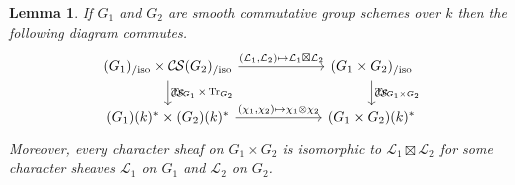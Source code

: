 \documentclass[10pt]{amsart}
\theoremstyle{plain}
\newtheorem{lemma}[theorem]{Lemma}
\theoremstyle{definition}
\newcommand{\Fq}{k}
\DeclareMathOperator{\id}{id}
\newcommand{\ceq}{{\, :=\, }}
\newcommand{\iso}{{\ \cong\ }}
\newcommand{\TrFrob}[1]{\operatorname{Tr}_{#1}}
\newcommand{\cs}[1]{{\mathcal{#1}}}
\newcommand{\gcs}[1]{{\mathcal{\bar #1}}}
\newcommand{\CS}{{\mathcal{C\hskip-0.8pt S}}}
\newcommand{\CSiso}[1]{\CS(#1)_{/\text{iso}}}
\begin{document}
\begin{lemma}\label{lem:product}
If $G_1$ and $G_2$ are smooth commutative group schemes over $\Fq$ then the following diagram commutes.
\[
\begin{tikzcd}[column sep=60]
\arrow{d}{\TrFrob{G_1} \times \TrFrob{G_2}} \CSiso{G_1}\times \CSiso{G_2} \arrow{r}{(\cs{L}_1,\cs{L}_2)\mapsto \cs{L}_1\boxtimes \cs{L}_2}
& \arrow{d}{\TrFrob{G_1\times G_2}} \CSiso{G_1\times G_2}\\
(G_1)(\Fq)^*\times (G_2)(\Fq)^* \arrow{r}{(\chi_1,\chi_2)\mapsto \chi_1\otimes \chi_2}  & (G_1\times G_2)(\Fq)^*
\end{tikzcd}
\]
Moreover, every character sheaf on $G_1\times G_2$ is isomorphic to $\cs{L}_1\boxtimes\cs{L}_2$
for some character sheaves $\cs{L}_1$ on $G_1$ and $\cs{L}_2$ on $G_2$.
\end{lemma}

\iffalse
\begin{proof}
The only non-trivial part is the last claim, so we will only address that point here.
%
Set $G \ceq G_1\times G_2$
and write $e_1$ and $e_2$ for the identity elements of $G_1$ and $G_2$.
Define $f : G\to G\times G$ by $f(g_1,g_2) \ceq (g_1,e_2,e_1,g_2)$.
Observe that $m\circ f = \id_G$.
Let $p_1$, $p_2$ be the projection morphisms pictured below:
\[
\begin{tikzcd}
G & \arrow[swap]{l}{p_1} G\times G \arrow{r}{p_2} & G.
\end{tikzcd}
\]
Let $r_1$ and $r_2$ be the projection morphisms pictured below,
with sections $q_1$ and $q_2$, also morphisms of group schemes:
\[
\begin{tikzcd}
G_1  \arrow[swap, bend right]{r}{q_1} &
\arrow[swap, bend right]{l}{r_1} G_1\times G_2 \arrow[bend left]{r}{r_2} &
\arrow[bend left]{l}{q_2} G_2.
\end{tikzcd}
\]
Observe that $p_1\circ f = q_1 \circ r_1$ and $p_2 \circ f = q_2\circ r_2$.
%
Now, let $\cs{L} \ceq (\gcs{L},\mu,\phi)$ be a character sheaf on $G$
and set $\cs{L}_1 \ceq q_1^* \cs{L}$ and $\cs{L}_2 \ceq q_2^* \cs{L}$.
By Lemma~\ref{lem:pullback}, $\cs{L}_1$ is a character sheaf on $G_1$
and $\cs{L}_2$ is a character sheaf on $G_2$.
We will obtain an isomorphism $\cs{L} \iso  \cs{L}_1\boxtimes \cs{L}_2$.

Applying the functor $f^*$ to the isomorphism $\mu$ yields
\begin{equation}\label{eq:fm}
f^*\mu : f^* m^* \gcs{L} \to f^*(\gcs{L}\boxtimes \gcs{L}) .
\end{equation}
We have already seen that $m\circ f = \id_G$, so $f^* m^* \gcs{L} = \gcs{L}$.  
Since $f^*p_1^*\gcs{L} = r_1^* q_1^* \gcs{L} = r_1^* \gcs{L}_1$ and $f^*p_2^*\gcs{L} = r_2^* q_2^* \gcs{L} = r_2^*\gcs{L}_2$,
we have 
\[
f^*(\gcs{L}\boxtimes \gcs{L})  = f^*p_1^*\gcs{L}\otimes f^* p_2^*\gcs{L} = \gcs{L}_1\boxtimes \gcs{L}_2.
\]
It follows that \eqref{eq:fm} gives an isomorphism $\gcs{L} \to  \gcs{L}_1\boxtimes \gcs{L}_2$.
It is routine to show that this morphism satisfies
\ref{CS.4}, as it applies here,
from which it follows that we have exhibited an isomorphism
$\cs{L} \to \cs{L}_1\boxtimes \cs{L}_2$ of characters sheaves on $G\times G$.
\end{proof}
\fi
\end{document}

